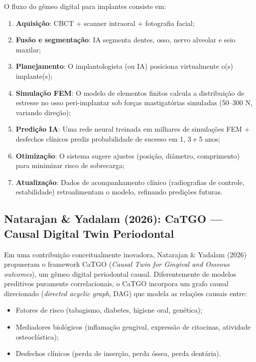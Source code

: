 O fluxo do gêmeo digital para implantes consiste em:
\begin{enumerate}
    \item \textbf{Aquisição}: CBCT + scanner intraoral + fotografia facial;
    \item \textbf{Fusão e segmentação}: IA segmenta dentes, osso, nervo alveolar e seio maxilar;
    \item \textbf{Planejamento}: O implantologista (ou IA) posiciona virtualmente o(s) implante(s);
    \item \textbf{Simulação FEM}: O modelo de elementos finitos calcula a distribuição de estresse no osso peri-implantar sob forças mastigatórias simuladas (50--300 N, variando direção);
    \item \textbf{Predição IA}: Uma rede neural treinada em milhares de simulações FEM + desfechos clínicos prediz probabilidade de sucesso em 1, 3 e 5 anos;
    \item \textbf{Otimização}: O sistema sugere ajustes (posição, diâmetro, comprimento) para minimizar risco de sobrecarga;
    \item \textbf{Atualização}: Dados de acompanhamento clínico (radiografias de controle, estabilidade) retroalimentam o modelo, refinando predições futuras.
\end{enumerate}


\subsection{Natarajan \& Yadalam (2026): CaTGO --- Causal Digital Twin Periodontal}

Em uma contribuição conceitualmente inovadora, Natarajan \& Yadalam (2026) propuseram o framework CaTGO (\textit{Causal Twin for Gingival and Osseous outcomes}), um gêmeo digital periodontal causal. Diferentemente de modelos preditivos puramente correlacionais, o CaTGO incorpora um grafo causal direcionado (\textit{directed acyclic graph}, DAG) que modela as relações causais entre:
\begin{itemize}
    \item Fatores de risco (tabagismo, diabetes, higiene oral, genética);
    \item Mediadores biológicos (inflamação gengival, expressão de citocinas, atividade osteoclástica);
    \item Desfechos clínicos (perda de inserção, perda óssea, perda dentária).
\end{itemize}

